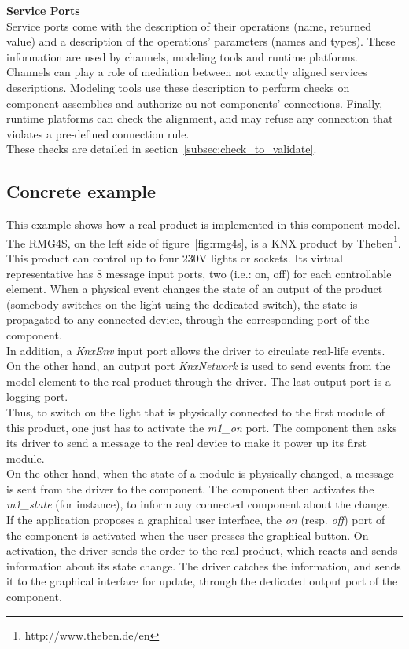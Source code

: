 {\bf Service Ports}\\

Service ports come with the description of their operations (name, returned value) and a description of the operations' parameters (names and types). These information are used by channels, modeling tools and runtime platforms. Channels can play a role of mediation between not exactly aligned services descriptions. Modeling tools use these description to perform checks on component assemblies and authorize au not components' connections. Finally, runtime platforms can check the alignment, and may refuse any connection that violates a pre-defined connection rule.\\
These checks are detailed in section~\ref{subsec:check_to_validate}.

\subsection{Concrete example}
\label{subsec:compoModConcreteExample}
This example shows how a real product is implemented in this component model. The RMG4S, on the left side of figure~\ref{fig:rmg4s}, is a KNX product by Theben\footnote{http://www.theben.de/en}. This product can control up to four 230V lights or sockets. Its virtual representative has 8 message input ports, two (i.e.: on, off) for each controllable element. When a physical event changes the state of an output of the product (somebody switches on the light using the dedicated switch), the state is propagated to any connected device, through the corresponding port of the component.\\
In addition, a {\it KnxEnv} input port allows the driver to circulate real-life events. On the other hand, an output port {\it KnxNetwork} is used to send events from the model element to the real product through the driver. The last output port is a logging port.\\
Thus, to switch on the light that is physically connected to the first module of this product, one just has to activate the {\it m1\_on} port. The component then asks its driver to send a message to the real device to make it power up its first module.\\
On the other hand, when the state of a module is physically changed, a message is sent from the driver to the component. The component then activates the {\it m1\_state} (for instance), to inform any connected component about the change.\\
If the application proposes a graphical user interface, the {\it on} (resp. {\it off}) port of the component is activated when the user presses the graphical button. On activation, the driver sends the order to the real product, which reacts and sends information about its state change. The driver catches the information, and sends it to the graphical interface for update, through the dedicated output port of the component.\\ 

